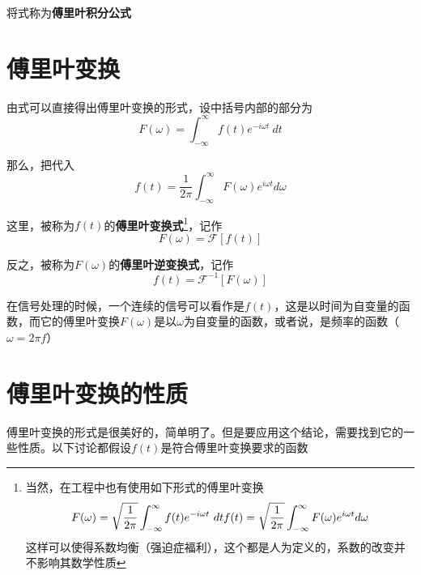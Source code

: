         将式称为\textbf{傅里叶积分公式}

    \section{傅里叶变换}

        由式可以直接得出傅里叶变换的形式，设中括号内部的部分为
        \begin{equation}
            F(\omega)=\int_{-\infty}^{\infty}f(t)e^{-i\omega t}\ dt
            \label{eq: 1.14}
        \end{equation}

        那么，把代入
        \begin{equation}
            f(t)=\dfrac{1}{2\pi}\int_{-\infty}^{\infty}F(\omega) e^{i\omega t} d\omega
            \label{eq: 1.15}
        \end{equation}

        这里，被称为$f(t)$的\textbf{傅里叶变换式}\footnote{当然，在工程中也有使用如下形式的傅里叶变换
            $$
            F(\omega)=\sqrt{\dfrac{1}{2\pi}}\int_{-\infty}^{\infty}f(t)e^{-i\omega t}\ dt\\
            f(t)=\sqrt{\dfrac{1}{2\pi}}\int_{-\infty}^{\infty}F(\omega) e^{i\omega t} d\omega
            $$
            这样可以使得系数均衡（强迫症福利），这个都是人为定义的，系数的改变并不影响其数学性质}，记作
        \begin{equation}
            F(\omega)=\mathscr{F}[f(t)]
            \label{eq: 1.16}
        \end{equation}

        反之，被称为$F(\omega)$的\textbf{傅里叶逆变换式}，记作
        \begin{equation}
            f(t)=\mathscr{F}^{-1}[F(\omega)]
            \label{eq: 1.17}
        \end{equation}
        
        在信号处理的时候，一个连续的信号可以看作是$f(t)$，这是以时间为自变量的函数，而它的傅里叶变换$F(\omega)$是以$\omega$为自变量的函数，或者说，是频率的函数（$\omega=2\pi f$）

    \section{傅里叶变换的性质}

        傅里叶变换的形式是很美好的，简单明了。但是要应用这个结论，需要找到它的一些性质。以下讨论都假设$f(t)$是符合傅里叶变换要求的函数

